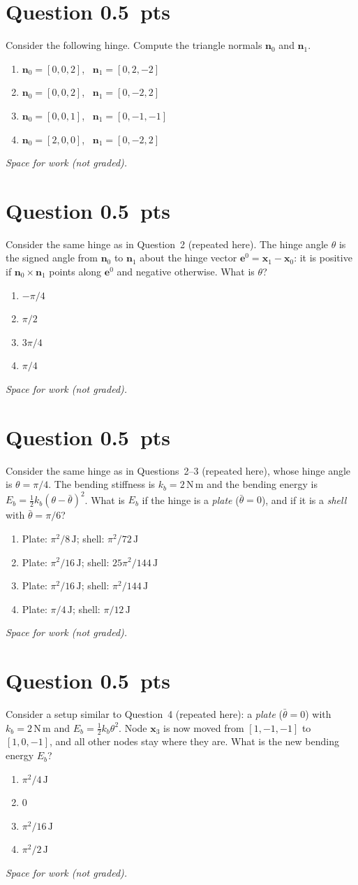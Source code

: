 \documentclass[letterpaper,11pt]{article}
\newcounter{qnum}
\newcommand{\qpts}{0.5}
\newcommand{\mcq}[5]{%
  \clearpage
  \stepcounter{qnum}%
  \section*{Question \theqnum \hfill \normalsize \qpts~pts}
  #1
  \begin{enumerate}[label=(\alph*)]
    \item #2
    \item #3
    \item #4
    \item #5
  \end{enumerate}
  \vspace{3mm}

  \textit{Space for work (not graded).}
}
\begin{document}
%
%
\mcq{Consider the following hinge. \hingesetup{}Compute the triangle normals $\mathbf{n}_0$ and $\mathbf{n}_1$.}
  {$\mathbf{n}_0 = [0, 0, 2]$, \ $\mathbf{n}_1 = [0, 2, -2]$}
  {$\mathbf{n}_0 = [0, 0, 2]$, \ $\mathbf{n}_1 = [0, -2, 2]$}
  {$\mathbf{n}_0 = [0, 0, 1]$, \ $\mathbf{n}_1 = [0, -1, -1]$}
  {$\mathbf{n}_0 = [2, 0, 0]$, \ $\mathbf{n}_1 = [0, -2, 2]$}

%
%
\mcq{Consider the same hinge as in Question~2 (repeated here). \hingesetup{}The hinge angle $\theta$ is the signed angle from $\mathbf{n}_0$ to $\mathbf{n}_1$ about the hinge vector $\mathbf{e}^0 = \mathbf{x}_1 - \mathbf{x}_0$: it is positive if $\mathbf{n}_0 \times \mathbf{n}_1$ points along $\mathbf{e}^0$ and negative otherwise. What is $\theta$?}
  {$-\pi/4$}
  {$\pi/2$}
  {$3\pi/4$}
  {$\pi/4$}

%
%
\mcq{Consider the same hinge as in Questions~2--3 (repeated here), whose hinge angle is $\theta = \pi/4$. \hingesetup{}The bending stiffness is $k_b = 2\,\mathrm{N\,m}$ and the bending energy is $E_b = \frac{1}{2} k_b (\theta - \bar{\theta})^2$. What is $E_b$ if the hinge is a \emph{plate} ($\bar{\theta} = 0$), and if it is a \emph{shell} with $\bar{\theta} = \pi/6$?}
  {Plate: $\pi^2/8\,\mathrm{J}$; shell: $\pi^2/72\,\mathrm{J}$}
  {Plate: $\pi^2/16\,\mathrm{J}$; shell: $25\pi^2/144\,\mathrm{J}$}
  {Plate: $\pi^2/16\,\mathrm{J}$; shell: $\pi^2/144\,\mathrm{J}$}
  {Plate: $\pi/4\,\mathrm{J}$; shell: $\pi/12\,\mathrm{J}$}

%
%
\mcq{Consider a setup similar to Question~4 (repeated here): a \emph{plate} ($\bar{\theta} = 0$) with $k_b = 2\,\mathrm{N\,m}$ and $E_b = \frac{1}{2} k_b \theta^2$. \hingesetup{}Node $\mathbf{x}_3$ is now moved from $[1, -1, -1]$ to $[1, 0, -1]$, and all other nodes stay where they are. What is the new bending energy $E_b$?}
  {$\pi^2/4\,\mathrm{J}$}
  {$0$}
  {$\pi^2/16\,\mathrm{J}$}
  {$\pi^2/2\,\mathrm{J}$}
\end{document}
